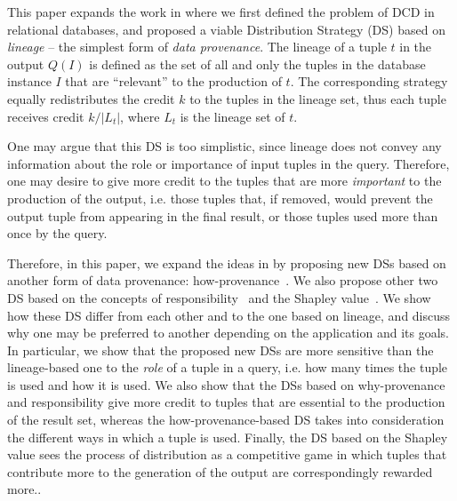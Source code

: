\documentclass[preprint,12pt,sort&compress]{elsarticle}
\newcommand{\rone}[1]{\textcolor{reviewer1}{#1}}
\newcommand{\rtwo}[1]{\textcolor{reviewer2}{#1}}
\newcommand{\scream}[1]{{\bf * #1 *}{\typeout{#1}}}
\begin{document}
This paper expands the work in \citep{dosso2020data} %
where we first defined the problem of DCD in relational databases, and proposed a viable Distribution Strategy (DS) based on \emph{lineage} -- the simplest form of \emph{data provenance}.
The lineage of a tuple $t$ in the output $Q(I)$ is defined as the set of all and only the tuples in the database instance $I$ that are ``relevant'' to the production of $t$.
The corresponding strategy equally redistributes the credit $k$ to the tuples in the lineage set, thus each tuple receives credit $k/|L_t|$, where $L_t$ is the lineage set of $t$. 

One may argue that this DS is too simplistic, since lineage 
does not convey any information about the role or importance of input tuples in the query.
Therefore, one may desire to give more credit to the tuples that are more {\em important} to the production of the output, i.e. those tuples that, if removed, would prevent the output tuple from appearing in the final result, or those tuples used more than once  by the query. 

Therefore, in this paper, we expand the ideas in \citep{dosso2020data} by proposing new DSs based on another form of data provenance:  how-provenance~\citep{howProvenanceGreen}.
We also propose other two DS based on the concepts of responsibility~\cite{MeliouGMS11} and the Shapley value~\cite{LivshitsBKS20,DFKM22}.
\rone{We show how these DS differ from each other and to the one based on lineage,} and discuss why one may be preferred to another depending on the application and its goals. 
In particular, we show that the proposed new DSs are more sensitive than the lineage-based one to the {\em role} of a tuple in a query, i.e. how many times the tuple is used and how it is used. 
We also show that the DSs based on why-provenance and \rtwo{responsibility} give more credit to tuples that are essential to the production of the result set, whereas the how-provenance-based DS takes into consideration the different ways in which a tuple is used.
\rtwo{Finally, the DS based on the Shapley value sees the process of distribution as a competitive game in which tuples that contribute more to the generation of the output are correspondingly rewarded more.}. 
\end{document}
